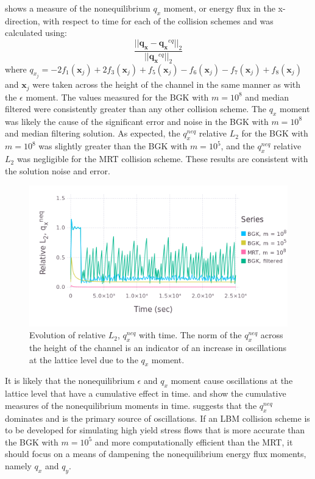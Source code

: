 \documentclass[pdftex,ms]{pittetd}
\newcommand{\pos}{\mathbf{x}}
\begin{document}
 shows a measure of the nonequilibrium $q_x$ moment, or energy flux in the x-direction, with respect to time for each of the collision schemes and was calculated using:
\begin{equation}
    \frac{||\mathbf{q_x} - \mathbf{q_x}^{eq}||_2}{||\mathbf{q_x}^{eq}||_2}
\end{equation}
\noindent where $q_{x_j} = - 2f_1(\pos_j) + 2f_3(\pos_j) + f_5(\pos_j) - f_6(\pos_j) - f_7(\pos_j) + f_8(\pos_j)$ and $\pos_j$ were taken across the height of the channel in the same manner as with the $\epsilon$ moment.
The values measured for the BGK with $m = 10^8$ and median filtered were consistently greater than any other collision scheme.
The $q_x$ moment was likely the cause of the significant error and noise in the BGK with $m = 10^8$ and median filtering solution.
As expected, the $q_x^{neq}$ relative $L_2$ for the BGK with $m = 10^8$ was slightly greater than the BGK with $m = 10^5$, and the $q_x^{neq}$ relative $L_2$ was negligible for the MRT collision scheme.
These results are consistent with the solution noise and error.

\begin{figure}
	\centering
    \includegraphics[width=\linewidth]{figs/poise-bingham/qx}
    \caption{Evolution of relative $L_2$, $q_x^{neq}$ with time. The norm of the $q_x^{neq}$ across the height of the channel is an indicator of an increase in oscillations at the lattice level due to the $q_x$ moment.}
    \label{fig:qx}
\end{figure}

It is likely that the nonequilibrium $\epsilon$ and $q_x$ moment cause oscillations at the lattice level that have a cumulative effect in time.
 and  show the cumulative measures of the nonequilibrium moments in time.
 suggests that the $q_x^{neq}$ dominates and is the primary source of oscillations.
If an LBM collision scheme is to be developed for simulating high yield stress flows that is more accurate than the BGK with $m = 10^5$ and more computationally efficient than the MRT, it should focus on a means of dampening the nonequilibrium energy flux moments, namely $q_x$ and $q_y$.
\end{document}
